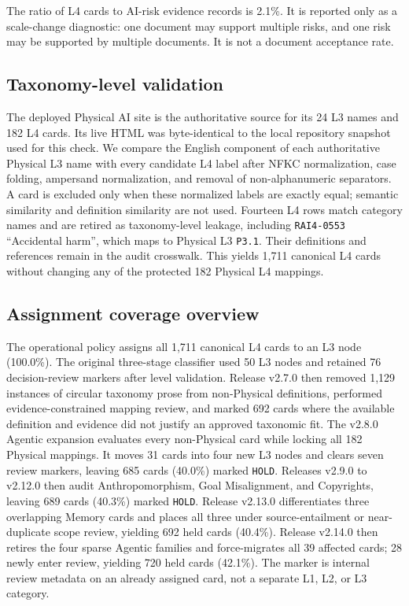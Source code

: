 \documentclass[11pt,a4paper]{article}
\newcommand{\code}[1]{\texttt{#1}}
\begin{document}
The ratio of L4 cards to AI-risk evidence records is 2.1\%. It is reported only
as a scale-change diagnostic: one document may support multiple risks, and one
risk may be supported by multiple documents. It is not a document acceptance
rate.

\subsection{Taxonomy-level validation}

The deployed Physical AI site is the authoritative source for its 24 L3 names
and 182 L4 cards. Its live HTML was byte-identical to the local repository
snapshot used for this check. We compare the English component of each
authoritative Physical L3 name with every candidate L4 label after NFKC
normalization, case folding, ampersand normalization, and removal of
non-alphanumeric separators. A card is excluded only when these normalized
labels are exactly equal; semantic similarity and definition similarity are not
used. Fourteen L4 rows match category names and are retired as taxonomy-level
leakage, including \code{RAI4-0553} ``Accidental harm'', which maps to Physical
L3 \code{P3.1}. Their definitions and references remain in the audit crosswalk.
This yields 1,711 canonical L4 cards without changing any of the protected 182
Physical L4 mappings.

\subsection{Assignment coverage overview}

The operational policy assigns all 1,711 canonical L4 cards to an L3 node
(100.0\%). The original three-stage classifier used 50 L3 nodes and retained
76 decision-review markers after level validation. Release v2.7.0 then removed
1,129 instances of circular taxonomy prose from non-Physical definitions,
performed evidence-constrained mapping review, and marked 692 cards where the
available definition and evidence did not justify an approved taxonomic fit.
The v2.8.0 Agentic expansion evaluates every non-Physical card while locking
all 182 Physical mappings. It moves 31 cards into four new L3 nodes and clears
seven review markers, leaving 685 cards (40.0\%) marked \code{HOLD}. Releases
v2.9.0 to v2.12.0 then audit Anthropomorphism, Goal Misalignment, and Copyrights,
leaving 689 cards (40.3\%) marked \code{HOLD}. Release v2.13.0 differentiates
three overlapping Memory cards and places all three under source-entailment or
near-duplicate scope review, yielding 692 held cards (40.4\%). Release v2.14.0
then retires the four sparse Agentic families and force-migrates all 39 affected
cards; 28 newly enter review, yielding 720 held cards (42.1\%). The marker
is internal review metadata on an already assigned card, not a separate L1,
L2, or L3 category.
\end{document}

